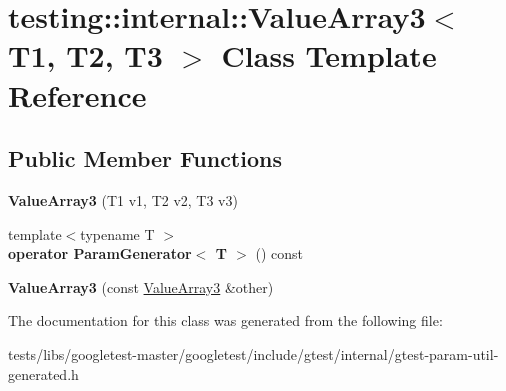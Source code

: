 \hypertarget{classtesting_1_1internal_1_1ValueArray3}{}\section{testing\+:\+:internal\+:\+:Value\+Array3$<$ T1, T2, T3 $>$ Class Template Reference}
\label{classtesting_1_1internal_1_1ValueArray3}
\subsection*{Public Member Functions}
\begin{DoxyCompactItemize}
\item 
\mbox{\label{classtesting_1_1internal_1_1ValueArray3_aa83b0671fed7a231ba127600c904246d}} 
{\bfseries Value\+Array3} (T1 v1, T2 v2, T3 v3)
\item 
\mbox{\label{classtesting_1_1internal_1_1ValueArray3_a4922d1cf7af801e82bdead15817b23fc}} 
{\footnotesize template$<$typename T $>$ }\\{\bfseries operator Param\+Generator$<$ T $>$} () const
\item 
\mbox{\label{classtesting_1_1internal_1_1ValueArray3_a742d8b00de6b63b020740ebbc7bc8d31}} 
{\bfseries Value\+Array3} (const \hyperlink{classtesting_1_1internal_1_1ValueArray3}{Value\+Array3} \&other)
\end{DoxyCompactItemize}


The documentation for this class was generated from the following file\+:\begin{DoxyCompactItemize}
\item 
tests/libs/googletest-\/master/googletest/include/gtest/internal/gtest-\/param-\/util-\/generated.\+h\end{DoxyCompactItemize}
